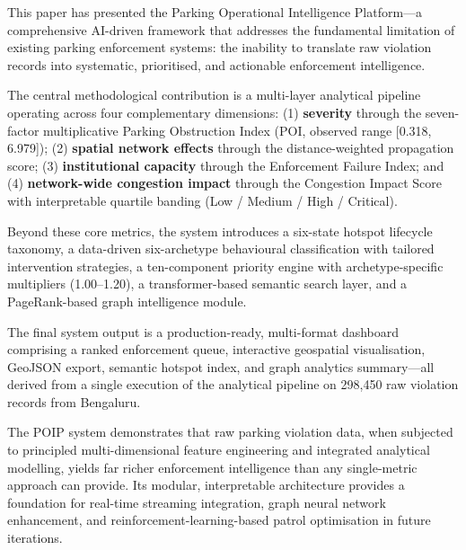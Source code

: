 \documentclass[12pt,a4paper]{article}
\begin{document}
This paper has presented the Parking Operational Intelligence Platform—a comprehensive
AI-driven framework that addresses the fundamental limitation of existing parking enforcement
systems: the inability to translate raw violation records into systematic, prioritised, and
actionable enforcement intelligence.

The central methodological contribution is a multi-layer analytical pipeline operating
across four complementary dimensions: (1) \textbf{severity} through the seven-factor
multiplicative Parking Obstruction Index (POI, observed range [0.318, 6.979]); (2)
\textbf{spatial network effects} through the distance-weighted propagation score; (3)
\textbf{institutional capacity} through the Enforcement Failure Index; and (4)
\textbf{network-wide congestion impact} through the Congestion Impact Score with
interpretable quartile banding (Low / Medium / High / Critical).

Beyond these core metrics, the system introduces a six-state hotspot lifecycle taxonomy, a
data-driven six-archetype behavioural classification with tailored intervention strategies, a
ten-component priority engine with archetype-specific multipliers (1.00--1.20), a
transformer-based semantic search layer, and a PageRank-based graph intelligence module.

The final system output is a production-ready, multi-format dashboard comprising a ranked
enforcement queue, interactive geospatial visualisation, GeoJSON export, semantic hotspot
index, and graph analytics summary—all derived from a single execution of the analytical
pipeline on 298,450 raw violation records from Bengaluru.

The POIP system demonstrates that raw parking violation data, when subjected to principled
multi-dimensional feature engineering and integrated analytical modelling, yields far richer
enforcement intelligence than any single-metric approach can provide. Its modular,
interpretable architecture provides a foundation for real-time streaming integration, graph
neural network enhancement, and reinforcement-learning-based patrol optimisation in future
iterations.
\end{document}
